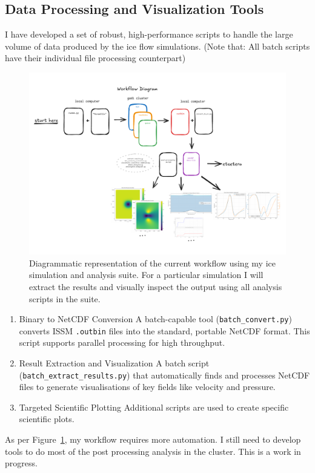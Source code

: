 \subsection{Data Processing and Visualization Tools}\label{dataviz}
I have developed a set of robust, high-performance scripts to handle the large volume of data produced by the ice flow simulations. (Note that: All batch scripts have their individual file processing counterpart)
\begin{figure}[H]
    \includegraphics[scale=0.58]{figures/workflow_diagram.pdf}
    \caption{Diagrammatic representation of the current workflow using my ice simulation and analysis suite. For a particular simulation I will extract the results and visually inspect the output using  all analysis scripts in the suite.}
    \label{fig:workflow}
\end{figure}
\begin{enumerate}
\item{Binary to NetCDF Conversion} A batch-capable tool (\texttt{batch\_convert.py}) converts ISSM \texttt{.outbin} files into the standard, portable NetCDF format. This script supports parallel processing for high throughput.
\item{Result Extraction and Visualization} A batch script (\texttt{batch\_extract\_results.py}) that automatically finds and processes NetCDF files to generate visualisations of key fields like velocity and pressure. 
\item{Targeted Scientific Plotting} Additional scripts are used to create specific scientific plots.
\end{enumerate}
As per Figure~\ref{fig:workflow}, my workflow requires more automation. I still need to develop tools to do most of the post processing analysis in the cluster. This is  a work in progress.

